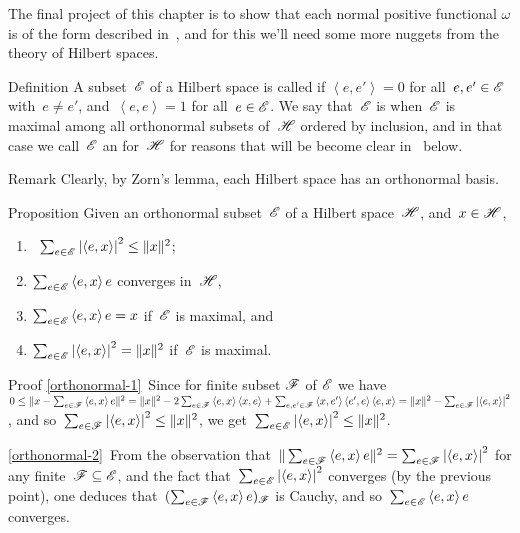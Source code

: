 \documentclass[a]{subfiles}
\begin{document}
\begin{parsec}%
\begin{point}%
The final project of this chapter
is to show that each normal positive functional
$\omega$ is of the form described in~,
and for this we'll need some more nuggets
from the theory of Hilbert spaces.
\end{point}
\begin{point}{Definition}%
A subset~$\mathscr{E}$ of a Hilbert space
is called 
if $\left<e,e'\right>=0$
for all~$e,e'\in\mathscr{E}$ with~$e\neq e'$,
and~$\left<e,e\right>=1$
for all~$e\in\mathscr{E}$.
We say that~$\mathscr{E}$ is 
when~$\mathscr{E}$ is maximal
among all orthonormal  subsets of~$\mathscr{H}$
ordered by inclusion,
and in that case
we call~$\mathscr{E}$ an 
for~$\mathscr{H}$
for reasons that will be become clear in~
below.
\begin{point}{Remark}%
Clearly, by Zorn's lemma,
each Hilbert space has an orthonormal basis.
\end{point}
\end{point}
\begin{point}[orthonormal]{Proposition}%
Given an orthonormal subset~$\mathscr{E}$
of a Hilbert space~$\mathscr{H}$,
and~$x\in \mathscr{H}$,
\begin{enumerate}
\item
\label{orthonormal-1}
\ 
 $\sum_{e\in \mathscr{E}}\left|\left<e,x\right>\right|^2
\leq \|x\|^2$;
\item
\label{orthonormal-2}
$\sum_{e\in \mathscr{E}} \left<e,x\right>e$
converges in~$\mathscr{H}$,
\item
\label{orthonormal-3}
$\sum_{e\in \mathscr{E}} \left<e,x\right>e=x$
if~$\mathscr{E}$ is maximal, and
\item
\label{orthonormal-4}
$\sum_{e\in\mathscr{E}}\left|\left<e,x\right>\right|^2 = \|x\|^2$
if~$\mathscr{E}$ is maximal.
\end{enumerate}
\begin{point}{Proof}%
\ref{orthonormal-1}\ 
Since for finite subset $\mathscr{F}$ of $\mathscr{E}$
we have $0\leq \|x-\sum_{e\in \mathscr{F}} \left<e,x\right>e\|^2
= \|x\|^2-2\sum_{e\in \mathscr{F}} \left<e,x\right>\left<x,e\right>
+ \sum_{e,e'\in\mathscr{F}} \left<x,e'\right>\left<e',e\right>\left<e,x\right>
= \|x\|^2-\sum_{e\in\mathscr{F}}\left|\left<e,x\right>\right|^2$,
and so~$\sum_{e\in\mathscr{F}} \left|\left<e,x\right>\right|^2\leq \|x\|^2$,
we get~$\sum_{e\in\mathscr{E}}\left|\left<e,x\right>\right|^2\leq \|x\|^2$.

\ref{orthonormal-2}\ 
From the observation
that~$\|\sum_{e\in\mathscr{F}} \left<e,x\right>e\|^2
= \sum_{e\in \mathscr{F}} \left|\left<e,x\right>\right|^2$
for any finite~$\mathscr{F}\subseteq \mathscr{E}$,
and the fact that~$\sum_{e\in \mathscr{E}} \left|\left<e,x\right>\right|^2$
converges (by the previous point),
one deduces that~$(\sum_{e\in\mathscr{F}} \left<e,x\right>e)_{\mathscr{F}}$
is Cauchy,
and so~$\sum_{e\in\mathscr{E}} \left<e,x\right>e$
converges.


\end{point}
\end{point}
\end{parsec}
\end{document}
